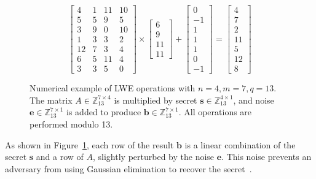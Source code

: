 \begin{figure}[htbp]
    \centering
    \begin{equation}
        \begin{bmatrix}
            4 & 1 & 11 & 10 \\
            5 & 5 & 9 & 5 \\
            3 & 9 & 0 & 10 \\
            1 & 3 & 3 & 2 \\
            12 & 7 & 3 & 4 \\
            6 & 5 & 11 & 4 \\
            3 & 3 & 5 & 0
        \end{bmatrix}
        \times
        \begin{bmatrix}
            6 \\ 9 \\ 11 \\ 11
        \end{bmatrix}
        +
        \begin{bmatrix}
            0 \\ -1 \\ 1 \\ 1 \\ 1 \\ 0 \\ -1
        \end{bmatrix}
        =
        \begin{bmatrix}
            4 \\ 7 \\ 2 \\ 11 \\ 5 \\ 12 \\ 8
        \end{bmatrix}
    \end{equation}
    \caption{Numerical example of LWE operations with $n=4, m=7, q=13$. The matrix $A \in \mathbb{Z}_{13}^{7 \times 4}$ is multiplied by secret $\mathbf{s} \in \mathbb{Z}_{13}^{4 \times 1}$, and noise $\mathbf{e} \in \mathbb{Z}_{13}^{7 \times 1}$ is added to produce $\mathbf{b} \in \mathbb{Z}_{13}^{7 \times 1}$. All operations are performed modulo 13. }
    \label{fig:lwe_operations_matrix}
\end{figure}



As shown in Figure~\ref{fig:lwe_operations_matrix}, each row of the result $\mathbf{b}$ is a linear combination of the secret $\mathbf{s}$ and a row of $A$, slightly perturbed by the noise $\mathbf{e}$.
This noise prevents an adversary from using Gaussian elimination to recover the secret~\cite{Fauzi2021-gw}.

